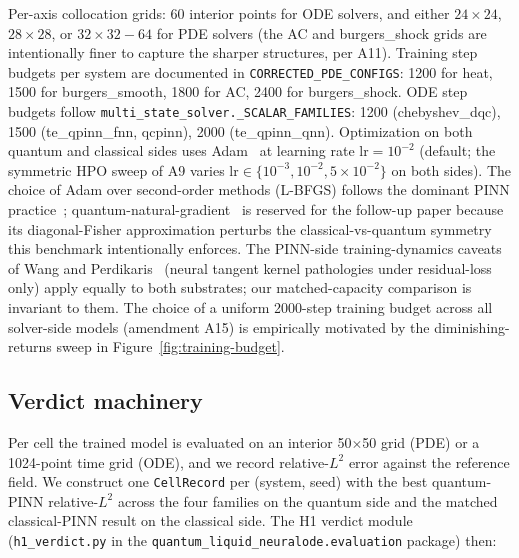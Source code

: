 Per-axis collocation grids: 60 interior points for ODE solvers, and
either $24{\times}24$, $28{\times}28$, or $32{\times}32{-}64$
for PDE solvers (the AC and burgers\_shock grids are intentionally
finer to capture the sharper structures, per A11). Training step
budgets per system are documented in
\texttt{CORRECTED\_PDE\_CONFIGS}: 1200 for heat, 1500 for
burgers\_smooth, 1800 for AC, 2400 for burgers\_shock. ODE step
budgets follow \texttt{multi\_state\_solver.\_SCALAR\_FAMILIES}:
1200 (chebyshev\_dqc), 1500 (te\_qpinn\_fnn, qcpinn), 2000
(te\_qpinn\_qnn). Optimization on both quantum and classical
sides uses Adam~\cite{kingma2015adam} at learning rate
$\mathrm{lr}=10^{-2}$ (default; the symmetric HPO sweep of A9
varies $\mathrm{lr} \in \{10^{-3}, 10^{-2}, 5\!\times\!10^{-2}\}$
on both sides). The choice of Adam over second-order methods
(L-BFGS) follows the dominant PINN
practice~\cite{raissi2019physics,karniadakis2021physics};
quantum-natural-gradient~\cite{stokes2020quantum} is reserved
for the follow-up paper because its diagonal-Fisher
approximation perturbs the classical-vs-quantum symmetry this
benchmark intentionally enforces. The PINN-side
training-dynamics caveats of Wang and
Perdikaris~\cite{wang2022whenwhy} (neural tangent kernel
pathologies under residual-loss only) apply equally to both
substrates; our matched-capacity comparison is invariant to
them. The choice of a uniform 2000-step training budget across all
solver-side models (amendment A15) is empirically motivated by the
diminishing-returns sweep in Figure~\ref{fig:training-budget}.

\subsection{Verdict machinery}
\label{sec:methods-verdict}

Per cell the trained model is evaluated on an interior 50$\times$50
grid (PDE) or a 1024-point time grid (ODE), and we record
relative-$L^2$ error against the reference field. We construct one
\texttt{CellRecord} per (system, seed) with the best quantum-PINN
relative-$L^2$ across the four families on the quantum side and
the matched classical-PINN result on the classical side. The H1
verdict module (\texttt{h1\_verdict.py} in the
\texttt{quantum\_liquid\_neuralode.evaluation} package) then:

